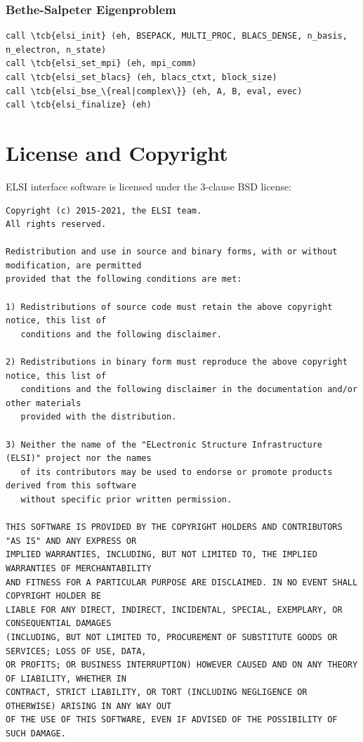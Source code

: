 \documentclass{report}
\newcommand{\tcb}[1]{\textcolor{blue}{#1}}
\begin{document}
\subsection*{Bethe-Salpeter Eigenproblem}
\begin{tcolorbox}
\begin{Verbatim}[commandchars=\\\{\}]
call \tcb{elsi_init} (eh, BSEPACK, MULTI_PROC, BLACS_DENSE, n_basis, n_electron, n_state)
call \tcb{elsi_set_mpi} (eh, mpi_comm)
call \tcb{elsi_set_blacs} (eh, blacs_ctxt, block_size)
call \tcb{elsi_bse_\{real|complex\}} (eh, A, B, eval, evec)
call \tcb{elsi_finalize} (eh)
\end{Verbatim}
\end{tcolorbox}




\chapter*{License and Copyright}
ELSI interface software is licensed under the 3-clause BSD license:

\begin{tcolorbox}
\begin{Verbatim}
Copyright (c) 2015-2021, the ELSI team.
All rights reserved.

Redistribution and use in source and binary forms, with or without modification, are permitted
provided that the following conditions are met:

1) Redistributions of source code must retain the above copyright notice, this list of
   conditions and the following disclaimer.

2) Redistributions in binary form must reproduce the above copyright notice, this list of
   conditions and the following disclaimer in the documentation and/or other materials
   provided with the distribution.

3) Neither the name of the "ELectronic Structure Infrastructure (ELSI)" project nor the names
   of its contributors may be used to endorse or promote products derived from this software
   without specific prior written permission.

THIS SOFTWARE IS PROVIDED BY THE COPYRIGHT HOLDERS AND CONTRIBUTORS "AS IS" AND ANY EXPRESS OR
IMPLIED WARRANTIES, INCLUDING, BUT NOT LIMITED TO, THE IMPLIED WARRANTIES OF MERCHANTABILITY
AND FITNESS FOR A PARTICULAR PURPOSE ARE DISCLAIMED. IN NO EVENT SHALL COPYRIGHT HOLDER BE
LIABLE FOR ANY DIRECT, INDIRECT, INCIDENTAL, SPECIAL, EXEMPLARY, OR CONSEQUENTIAL DAMAGES
(INCLUDING, BUT NOT LIMITED TO, PROCUREMENT OF SUBSTITUTE GOODS OR SERVICES; LOSS OF USE, DATA,
OR PROFITS; OR BUSINESS INTERRUPTION) HOWEVER CAUSED AND ON ANY THEORY OF LIABILITY, WHETHER IN
CONTRACT, STRICT LIABILITY, OR TORT (INCLUDING NEGLIGENCE OR OTHERWISE) ARISING IN ANY WAY OUT
OF THE USE OF THIS SOFTWARE, EVEN IF ADVISED OF THE POSSIBILITY OF SUCH DAMAGE.
\end{Verbatim}
\end{tcolorbox}
\end{document}
